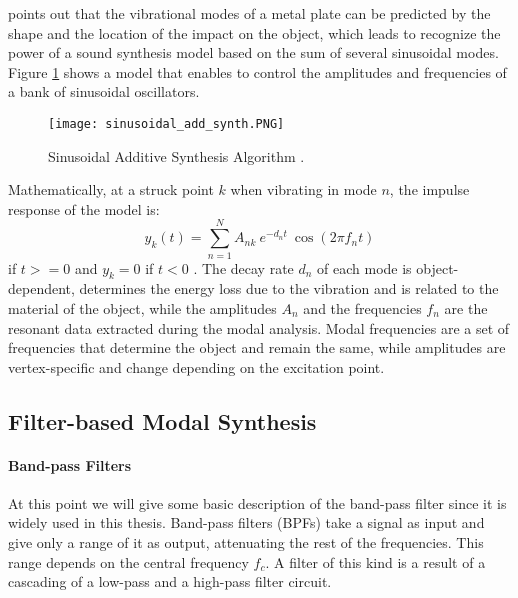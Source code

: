 \cite{Cook:2002:RSS:515316} points out that the vibrational modes of a  metal plate can be predicted by the shape and the location of the impact on the object, which leads to recognize the power of a sound synthesis model based on the sum of several sinusoidal modes. Figure \ref{fig:sin_add_synth} shows a model that enables to control the amplitudes and frequencies of a bank of sinusoidal oscillators.

\begin{figure}[H]
  \centering
    \texttt{[image: sinusoidal\_add\_synth.PNG]}
      \caption{Sinusoidal Additive Synthesis Algorithm \cite{Cook:2002:RSS:515316}.}
      \label{fig:sin_add_synth}
\end{figure}

Mathematically, at a struck point $k$ when vibrating in mode $n$, the impulse response of the model is:
\begin{equation}\label{eq:modal_response}
y_k(t) = \sum\limits_{n=1}^{N} A_{nk}\ e^{-d_n t}\ \cos(2 \pi f_nt)
\end{equation}
if $t>=0$ and $y_k = 0$ if $t<0$ \cite{van2001foleyautomatic}. The decay rate $d_n$ of each mode is object-dependent, determines the energy loss due to the vibration and is related to the material of the object, while the amplitudes $A_n$ and the frequencies $f_n$ are the resonant data extracted during the modal analysis. Modal frequencies are a set of frequencies that determine the object and remain the same, while amplitudes are vertex-specific and change depending on the excitation point.

\subsection{Filter-based Modal Synthesis}\label{sec:add_synth}

\paragraph{Band-pass Filters\\}\label{par:bpf}

At this point we will give some basic description of the band-pass filter since it is widely used in this thesis. Band-pass filters (BPFs) take a signal as input and give only a range of it as output, attenuating the rest of the frequencies. This range depends on the central frequency $f_c$. A filter of this kind is a result of a cascading of a low-pass and a high-pass filter circuit.

